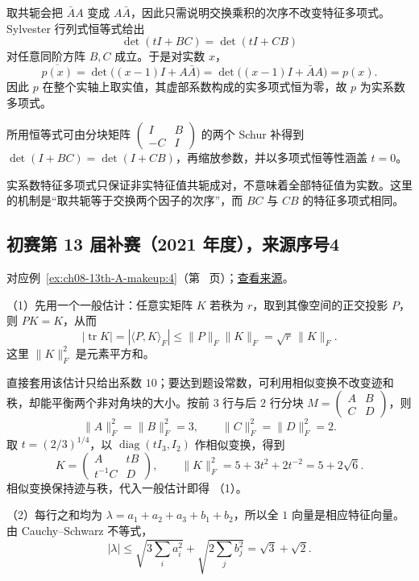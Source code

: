 \documentclass[12pt,fontset=fandol]{ctexart}
\begin{document}
\begin{solve}

取共轭会把 $\bar A A$ 变成 $A\bar A$，因此只需说明交换乘积的次序不改变特征多项式。Sylvester 行列式恒等式给出
\[
\det(tI+BC)=\det(tI+CB)
\]
对任意同阶方阵 $B,C$ 成立。于是对实数 $x$，
\[
\overline{p(x)}
=\det\bigl((x-1)I+A\bar A\bigr)
=\det\bigl((x-1)I+\bar A A\bigr)=p(x).
\]
因此 $p$ 在整个实轴上取实值，其虚部系数构成的实多项式恒为零，故 $p$ 为实系数多项式。

所用恒等式可由分块矩阵 $\begin{pmatrix}I&B\\-C&I\end{pmatrix}$ 的两个 Schur 补得到 $\det(I+BC)=\det(I+CB)$，再缩放参数，并以多项式恒等性涵盖 $t=0$。

\end{solve}

\begin{remark}[方法与条件]

实系数特征多项式只保证非实特征值共轭成对，不意味着全部特征值为实数。这里的机制是“取共轭等于交换两个因子的次序”，而 $BC$ 与 $CB$ 的特征多项式相同。

\end{remark}

\subsection{初赛第 13 届补赛（2021 年度），来源序号4}\label{ans:ch08-13th-A-makeup:4}\label{pr:ch08-13th-A-makeup:4}

对应例~\ref{ex:ch08-13th-A-makeup:4}（第~\pageref{ex:ch08-13th-A-makeup:4} 页）；\href{https://github.com/lzxcr/cmc-mathematics/blob/64916fa1fdbc3e444a652eca204d5669058ee321/src/problems/preliminary/13-makeup/04.md}{查看来源}。

\begin{solve}

（1）先用一个一般估计：任意实矩阵 $K$ 若秩为 $r$，取到其像空间的正交投影 $P$，则 $PK=K$，从而
\[
|\operatorname{tr}K|=|\langle P,K\rangle_F|
\leq\|P\|_F\|K\|_F=\sqrt r\,\|K\|_F.
\]
这里 $\|K\|_F^2$ 是元素平方和。

直接套用该估计只给出系数 $10$；要达到题设常数，可利用相似变换不改变迹和秩，却能平衡两个非对角块的大小。按前 $3$ 行与后 $2$ 行分块 $M=\begin{pmatrix}A&B\\C&D\end{pmatrix}$，则
\[
\|A\|_F^2=\|B\|_F^2=3,\qquad
\|C\|_F^2=\|D\|_F^2=2.
\]
取 $t=(2/3)^{1/4}$，以 $\operatorname{diag}(tI_3,I_2)$ 作相似变换，得到
\[
K=\begin{pmatrix}A&tB\\t^{-1}C&D\end{pmatrix},
\qquad \|K\|_F^2=5+3t^2+2t^{-2}=5+2\sqrt6.
\]
相似变换保持迹与秩，代入一般估计即得 （1）。

（2）每行之和均为 $\lambda=a_1+a_2+a_3+b_1+b_2$，所以全 $1$ 向量是相应特征向量。由 Cauchy--Schwarz 不等式，
\[
|\lambda|\leq\sqrt{3\sum_i a_i^2}+\sqrt{2\sum_j b_j^2}
=\sqrt3+\sqrt2.
\]

\end{solve}
\end{document}
